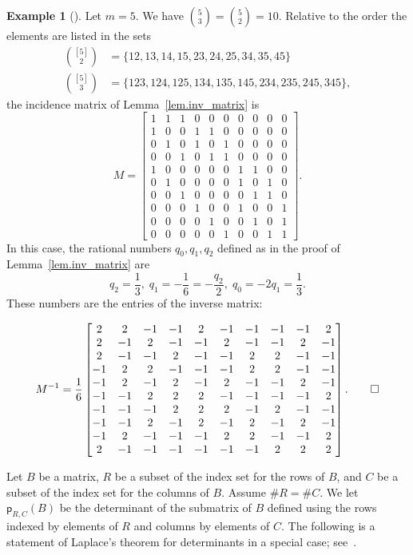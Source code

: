 \documentclass[11pt]{amsart}
\theoremstyle{remark}
\theoremstyle{remark}
\theoremstyle{definition}
\theoremstyle{definition}
\theoremstyle{definition}
\newtheorem{eg_no_qed}[theorem]{Example}
\newenvironment{ex}[1][]{\begin{eg_no_qed}[#1]\renewcommand{\qedsymbol}{$\Diamond$}\pushQED{\qed}}{\popQED\end{eg_no_qed}}
\numberwithin{equation}{section}
\newcommand{\pl}{\mathsf{p}}
\begin{document}
\begin{ex} Let $m = 5$. We have $\binom{5}{3} = \binom{5}{2} = 10$. Relative to the order the elements are listed in the sets 
\begin{align*}
\binom{[5]}{2} & = \{ 12,13,14,15,23,24,25,34,35,45 \} \\
\binom{[5]}{3} & = \{ 123,124,125,134,135,145,234,235, 245, 345\} , 
\end{align*}
the incidence matrix of Lemma~\ref{lem.inv_matrix} is 
\[
M= \begin{bmatrix} 1&1&1&0&0&0&0&0&0&0 \\ 1&0&0&1&1&0&0&0&0&0 \\ 0&1&0&1&0&1&0&0&0&0\\ 0&0&1&0&1&1&0&0&0&0 \\ 1&0&0&0&0&0&1&1&0&0\\ 0&1&0&0&0&0&1&0&1&0 \\ 0&0&1&0&0&0&0&1&1&0\\ 0&0&0&1&0&0&1&0&0&1\\ 0&0&0&0&1&0&0&1&0&1\\ 0&0&0&0&0&1&0&0&1&1  \end{bmatrix}.
\]
In this case, the rational numbers $q_0, q_1, q_{2}$ defined as in the proof of Lemma~\ref{lem.inv_matrix} are 
\[
q_2 = \frac{1}{3},\; q_1 = -\frac{1}{6} = -\frac{q_2}{2},\; q_0 = - 2q_1 = \frac{1}{3} .
\]
These numbers are the entries of the inverse matrix:

\[
M^{-1} = \frac{1}{6} \begin{bmatrix}
2 & 2 & -1 & -1 & 2 & -1 & -1 & -1 & -1 & 2 \\
2 & -1 & 2 & -1 & -1 & 2 & -1 & -1 & 2 & -1 \\
2 & -1 & -1 & 2 & -1 & -1 & 2 & 2 & -1 & -1 \\
-1 & 2 & 2 & -1 & -1 & -1 & 2 & 2 & -1 & -1 \\
-1 & 2 & -1 & 2 & -1 & 2 & -1 & -1 & 2 & -1 \\
-1 & -1 & 2 & 2 & 2 & -1 & -1 & -1 & -1 & 2 \\
-1 & -1 & -1 & 2 & 2 & 2 & -1 & 2 & -1 & -1 \\
-1 & -1 & 2 & -1 & 2 & -1 & 2 & -1 & 2 & -1 \\
-1 & 2 & -1 & -1 & -1 & 2 & 2 & -1 & -1 & 2 \\
2 & -1 & -1 & -1 & -1 & -1 & -1 & 2 & 2 & 2
\end{bmatrix} . \qedhere
\]
\end{ex}


Let $B$ be a matrix, $R$ be a subset of the index set for the rows of $B$, and $C$ be a subset of the index set for the columns of $B$. Assume $\#R = \#C$. We let $\pl_{R,C}(B)$ be the determinant  of the submatrix of $B$ defined using the rows indexed by elements of $R$ and columns by elements of $C$. The following is a statement of Laplace's theorem for determinants in a special case; see~\cite[Theorem 10.33]{Shafarevich}.
\end{document}
